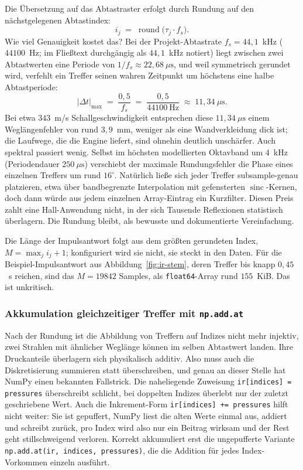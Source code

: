 Die Übersetzung auf das Abtastraster erfolgt durch Rundung auf den
nächstgelegenen Abtastindex:
\[
    i_j \;=\; \operatorname{round}\!\bigl(\tau_j \cdot f_s\bigr).
\]
Wie viel Genauigkeit kostet das? Bei der Projekt-Abtastrate
$f_s = 44{,}1$~kHz ($44100$~Hz; im Fließtext durchgängig als $44{,}1$~kHz
notiert) liegt zwischen zwei Abtastwerten eine Periode von
$1/f_s \approx 22{,}68~\mu\mathrm{s}$, und weil symmetrisch gerundet wird,
verfehlt ein Treffer seinen wahren Zeitpunkt um höchstens eine halbe
Abtastperiode:
\[
    \bigl|\Delta t\bigr|_{\max}
    \;=\; \frac{0{,}5}{f_s}
    \;=\; \frac{0{,}5}{44100~\text{Hz}}
    \;\approx\; 11{,}34~\mu\mathrm{s}.
\]
Bei etwa $343$~m/s Schallgeschwindigkeit entsprechen diese
$11{,}34~\mu\mathrm{s}$ einem Weglängenfehler von rund $3{,}9$~mm, weniger als
eine Wandverkleidung dick ist; die Laufwege, die die Engine liefert, sind
ohnehin deutlich unschärfer. Auch spektral passiert wenig. Selbst im höchsten
modellierten Oktavband um $4$~kHz (Periodendauer $250~\mu\mathrm{s}$)
verschiebt der maximale Rundungsfehler die Phase eines einzelnen Treffers um
rund $16^\circ$. Natürlich ließe sich jeder Treffer subsample-genau
platzieren, etwa über bandbegrenzte Interpolation mit gefensterten
$\operatorname{sinc}$-Kernen, doch dann würde aus jedem einzelnen Array-Eintrag
ein Kurzfilter. Diesen Preis zahlt eine Hall-Anwendung nicht, in der sich
Tausende Reflexionen statistisch überlagern. Die Rundung bleibt, als bewusste
und dokumentierte Vereinfachung.

Die Länge der Impulsantwort folgt aus dem größten gerundeten Index,
$M = \max_j i_j + 1$; konfiguriert wird sie nicht, sie steckt in den Daten.
Für die Beispiel-Impulsantwort aus Abbildung~\ref{fig:ir-stem}, deren Treffer
bis knapp $0{,}45$~s reichen, sind das $M = 19842$ Samples, als
\texttt{float64}-Array rund $155$~KiB. Das ist unkritisch.

\subsubsection{Akkumulation gleichzeitiger Treffer mit \texttt{np.add.at}}
\label{subsubsec:akkumulation}

Nach der Rundung ist die Abbildung von Treffern auf Indizes nicht mehr
injektiv, zwei Strahlen mit ähnlicher Weglänge können im selben Abtastwert
landen. Ihre Druckanteile überlagern sich physikalisch additiv. Also muss auch
die Diskretisierung summieren statt überschreiben, und genau an dieser Stelle
hat NumPy einen bekannten Fallstrick. Die naheliegende Zuweisung
\texttt{ir[indices] = pressures} überschreibt schlicht, bei doppelten Indizes
überlebt nur der zuletzt geschriebene Wert. Auch die Inkrement-Form
\texttt{ir[indices] += pressures} hilft nicht weiter: Sie ist gepuffert, NumPy
liest die alten Werte einmal aus, addiert und schreibt zurück, pro Index wird
also nur ein Beitrag wirksam und der Rest geht stillschweigend verloren.
Korrekt akkumuliert erst die ungepufferte Variante
\texttt{np.add.at(ir, indices, pressures)}, die die Addition für jedes
Index-Vorkommen einzeln ausführt.

